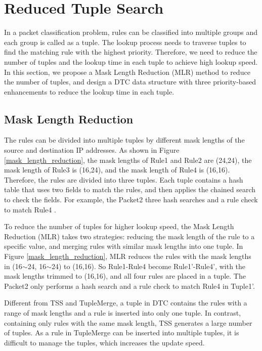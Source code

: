 \section{Reduced Tuple Search}

In a packet classification problem, rules can be classified into multiple groups and each group is called as a tuple. The lookup process needs to traverse tuples to find the matching rule with the highest priority. Therefore, we need to reduce the number of tuples and the lookup time in each tuple to achieve high lookup speed. In this section, we propose a Mask Length Reduction (MLR) method to reduce the number of tuples, and design a DTC data structure with three priority-based enhancements to reduce the lookup time in each tuple.

\subsection{Mask Length Reduction}

The rules can be divided into multiple tuples by different mask lengths of the source and destination IP addresses. As shown in Figure \ref{mask_length_reduction}, the mask lengths of Rule1 and Rule2 are (24,24), the mask length of Rule3 is (16,24), and the mask length of Rule4 is (16,16). Therefore, the rules are divided into three tuples.  Each tuple contains a hash table that uses two fields to match the rules, and then applies the chained search to check the  fields.  For example, the Packet2  three  hash searches and a rule check to match Rule4 .

To reduce the number of tuples for higher lookup speed, the Mask Length Reduction (MLR) takes two strategies:  reducing the mask length of the rule to a specific value, and merging rules with similar mask lengths into one tuple. In Figure \ref{mask_length_reduction}, MLR reduces the rules with the mask lengths in (16$\sim$24, 16$\sim$24) to (16,16). So Rule1-Rule4 become Rule1'-Rule4', with the mask lengths trimmed to (16,16), and all four rules are placed in a tuple. The Packet2 only performs a hash search and a rule check to match Rule4 in Tuple1'.

Different from TSS and TupleMerge, a tuple in DTC contains the rules with a range of mask lengths and a rule is inserted into only one tuple. In contrast, containing only rules with the same mask length, TSS generates a large number of tuples. As a rule in TupleMerge can be inserted into multiple tuples, it is difficult to manage the tuples, which increases the update speed.


